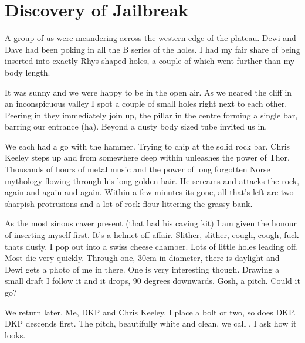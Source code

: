 \section{Discovery of Jailbreak}

 
A group of us were meandering across the western edge of the plateau. Dewi and Dave had been poking in all the B series of the holes. I had my fair share of being inserted into exactly Rhys shaped holes, a couple of which went further than my body length.
 
It was sunny and we were happy to be in the open air. As we neared the cliff in an inconspicuous valley I spot a couple of small holes right next to each other. Peering in they immediately join up, the pillar in the centre forming a single bar, barring our entrance (ha). Beyond a dusty body sized tube invited us in. 

We each had a go with the hammer. Trying to chip at the solid rock bar. Chris Keeley steps up and from somewhere deep within unleashes the power of Thor. Thousands of hours of metal music and the power of long forgotten Norse mythology flowing through his long golden hair. He screams and attacks the rock, again and again and again. Within a few minutes its gone, all that's left are two sharpish protrusions and a lot of rock flour littering the grassy bank. 
 
As the most sinous caver present (that had his caving kit) I am given the honour of inserting myself first. It's a helmet off affair. Slither, slither, cough, cough, fuck thats dusty. I pop out into a swiss cheese chamber. Lots of little holes leading off. Most die very quickly. Through one, 30cm in diameter, there is daylight and Dewi gets a photo of me in there. One is very interesting though. Drawing a small draft I follow it and it drops, 90 degrees downwards. Gosh, a pitch. Could it go?
 
We return later. Me, DKP and Chris Keeley. I place a bolt or two, so does DKP. DKP descends first. The pitch, beautifully white and clean, we call . I ask how it looks. 


